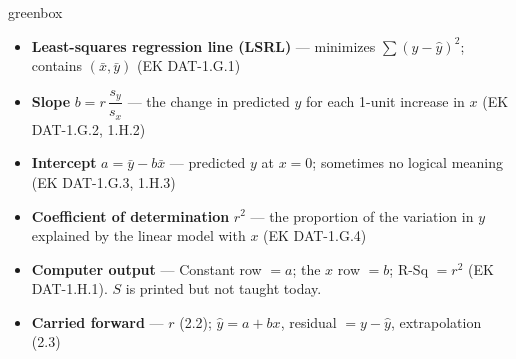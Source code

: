 \documentclass[10pt]{article}
\begin{document}
\boxguard
\begin{skillbox}{greenbox}
\begin{minipage}[t]{0.48\linewidth}
    \begin{itemize}
        \item \textbf{Least-squares regression line (LSRL)} --- minimizes $\sum(y - \hat y)^2$;
              contains $(\bar x, \bar y)$ (EK DAT-1.G.1)
        \item \textbf{Slope} $b = r\,\dfrac{s_y}{s_x}$ --- the change in predicted $y$ for each
              1-unit increase in $x$ (EK DAT-1.G.2, 1.H.2)
        \item \textbf{Intercept} $a = \bar y - b\bar x$ --- predicted $y$ at $x = 0$; sometimes
              no logical meaning (EK DAT-1.G.3, 1.H.3)
    \end{itemize}
\end{minipage}
\hfill
\begin{minipage}[t]{0.48\linewidth}
    \begin{itemize}
        \item \textbf{Coefficient of determination} $r^2$ --- the proportion of the variation in
              $y$ explained by the linear model with $x$ (EK DAT-1.G.4)
        \item \textbf{Computer output} --- Constant row $= a$; the $x$ row $= b$; R-Sq $= r^2$
              (EK DAT-1.H.1). $S$ is printed but not taught today.
        \item \textbf{Carried forward} --- $r$ (2.2); $\hat y = a + bx$, residual
              $= y - \hat y$, extrapolation (2.3)
    \end{itemize}
\end{minipage}
\end{skillbox}
\end{document}
